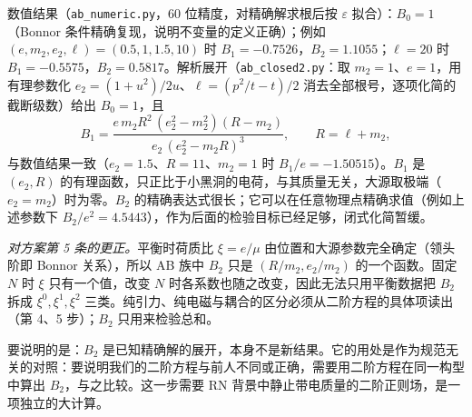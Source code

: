 \documentclass[11pt,a4paper]{ctexart}
\numberwithin{equation}{section}
\begin{document}
数值结果（\texttt{ab\_numeric.py}，60 位精度，对精确解求根后按 $\varepsilon$ 拟合）：$B_0=1$（Bonnor 条件精确复现，说明不变量的定义正确）；例如 $(e,m_2,e_2,\ell)=(0.5,1,1.5,10)$ 时 $B_1=-0.7526$，$B_2=1.1055$；$\ell=20$ 时 $B_1=-0.5575$，$B_2=0.5817$。解析展开（\texttt{ab\_closed2.py}：取 $m_2=1$、$e=1$，用有理参数化 $e_2=(1+u^2)/2u$、$\ell=(p^2/t-t)/2$ 消去全部根号，逐项化简的截断级数）给出 $B_0=1$，且
\begin{equation}
B_1=\frac{e\,m_2R^2\,(e_2^2-m_2^2)(R-m_2)}{e_2\,(e_2^2-m_2R)^3},\qquad R=\ell+m_2,
\label{eq:ABB1}
\end{equation}
与数值结果一致（$e_2=1.5$、$R=11$、$m_2=1$ 时 $B_1/e=-1.50515$）。$B_1$ 是 $(e_2,R)$ 的有理函数，只正比于小黑洞的电荷，与其质量无关，大源取极端（$e_2=m_2$）时为零。$B_2$ 的精确表达式很长；它可以在任意物理点精确求值（例如上述参数下 $B_2/e^2=4.5443$），作为后面的检验目标已经足够，闭式化简暂缓。

\emph{对方案第 5 条的更正。}平衡时荷质比 $\xi=e/\mu$ 由位置和大源参数完全确定（领头阶即 Bonnor 关系），所以 AB 族中 $B_2$ 只是 $(R/m_2,e_2/m_2)$ 的一个函数。固定 $N$ 时 $\xi$ 只有一个值，改变 $N$ 时各系数也随之改变，因此无法只用平衡数据把 $B_2$ 拆成 $\xi^0,\xi^1,\xi^2$ 三类。纯引力、纯电磁与耦合的区分必须从二阶方程的具体项读出（第 4、5 步）；$B_2$ 只用来检验总和。

要说明的是：$B_2$ 是已知精确解的展开，本身不是新结果。它的用处是作为规范无关的对照：要说明我们的二阶方程与前人不同或正确，需要用二阶方程在同一构型中算出 $B_2$，与之比较。这一步需要 RN 背景中静止带电质量的二阶正则场，是一项独立的大计算。
\end{document}

